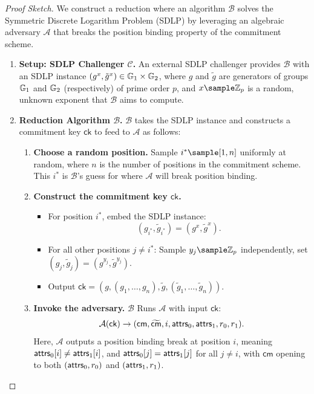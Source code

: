 \begin{proof}[Proof Sketch]
We construct a reduction where an algorithm $\mathcal{B}$ solves the Symmetric Discrete Logarithm Problem (SDLP) by leveraging an algebraic adversary $\mathcal{A}$ that breaks the position binding property of the commitment scheme.

\begin{enumerate}
    \item \textbf{Setup: SDLP Challenger $\mathcal{C}$.} An external SDLP challenger provides $\mathcal{B}$ with an SDLP instance $(g^x, \tilde{g}^x) \in \mathbb{G}_1 \times \mathbb{G}_2$, where $g$ and $\tilde{g}$ are generators of groups $\mathbb{G}_1$ and $\mathbb{G}_2$ (respectively) of prime order $p$, and $x \sample \Z_p$ is a random, unknown exponent that $\mathcal{B}$ aims to compute.

    \item \textbf{Reduction Algorithm $\mathcal{B}$.} $\mathcal{B}$ takes the SDLP instance and constructs a commitment key $\mathsf{ck}$ to feed to $\mathcal{A}$ as follows:

        \begin{enumerate}
        \item \textbf{Choose a random position.} Sample $i^* \sample [1, n]$ uniformly at random, where $n$ is the number of positions in the commitment scheme. This $i^*$ is $\mathcal{B}$'s guess for where $\mathcal{A}$ will break position binding.
        
        \item \textbf{Construct the commitment key $\mathsf{ck}$.}
        \begin{itemize}
            \item For position $i^*$, embed the SDLP instance: 
            $$(g_{i^*}, \tilde{g}_{i^*}) = (g^x, \tilde{g}^x).$$
            \item For all other positions $j \neq i^*$: Sample $y_j \sample \Z_p$ independently, set $(g_j, \tilde{g}_j) = (g^{y_j}, \tilde{g}^{y_j})$.
            \item Output $\mathsf{ck} = (g, (g_1, \ldots, g_n), \tilde{g}, (\tilde{g}_1, \ldots, \tilde{g}_n))$.
        \end{itemize}
        
        \item \textbf{Invoke the adversary.} $\mathcal{B}$ Runs $\mathcal{A}$ with input $\mathsf{ck}$: 
        $$\mathcal{A}(\mathsf{ck}) \rightarrow (\mathsf{cm}, \widetilde{\mathsf{cm}}, i, \mathsf{attrs}_0, \mathsf{attrs}_1, r_0, r_1).$$
        Here, $\mathcal{A}$ outputs a position binding break at position $i$, meaning $\mathsf{attrs}_0[i] \neq \mathsf{attrs}_1[i]$, and $\mathsf{attrs}_0[j] = \mathsf{attrs}_1[j]$ for all $j \neq i$, with $\mathsf{cm}$ opening to both $(\mathsf{attrs}_0, r_0)$ and $(\mathsf{attrs}_1, r_1)$.
    \end{enumerate}


\end{enumerate}
\end{proof}
